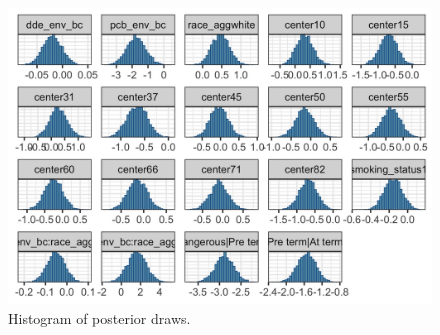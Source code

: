 \documentclass[10pt]{jmlr}%
\begin{document}
\begin{figure}
	\centering
	\includegraphics[width=\textwidth]{hists.jpeg}
	\caption{Histogram of posterior draws.}
	\label{fig:hists}
\end{figure}

%
\end{document}
